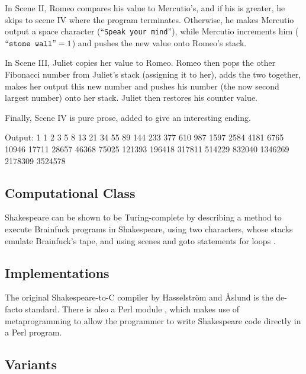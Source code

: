 In Scene II, Romeo compares his value to Mercutio's, and if his is greater, he skips to scene IV where the program terminates. Otherwise, he makes Mercutio output a space character (“\texttt{Speak your mind}”), while Mercutio increments him ($\text{“\texttt{stone wall}”} = 1$) and pushes the new value onto Romeo's stack.



In Scene III, Juliet copies her value to Romeo. Romeo then pops the other Fibonacci number from Juliet's stack (assigning it to her), adds the two together, makes her output this new number and pushes his number (the now second largest number) onto her stack. Juliet then restores his counter value.



Finally, Scene IV is pure prose, added to give an interesting ending.



\begin{io}
Output:
1 1 2 3 5 8 13 21 34 55 89 144 233 377 610 987 1597 2584
4181 6765 10946 17711 28657 46368 75025 121393 196418
317811 514229 832040 1346269 2178309 3524578
\end{io}

\subsection{Computational Class}

Shakespeare can be shown to be Turing-complete by describing a method to execute Brainfuck programs in Shakespeare, using two characters, whose stacks emulate Brainfuck's tape, and using scenes and goto statements for loops \cite{stux2005shakespeare}.

\subsection{Implementations}

The original Shakespeare-to-C compiler \cite{hasselstrom_shakespeare} by Hasselström and Åslund is the de-facto standard. There is also a Perl module \cite{barr_lingua}, which makes use of metaprogramming to allow the programmer to write Shakespeare code directly in a Perl program.

\subsection{Variants}

